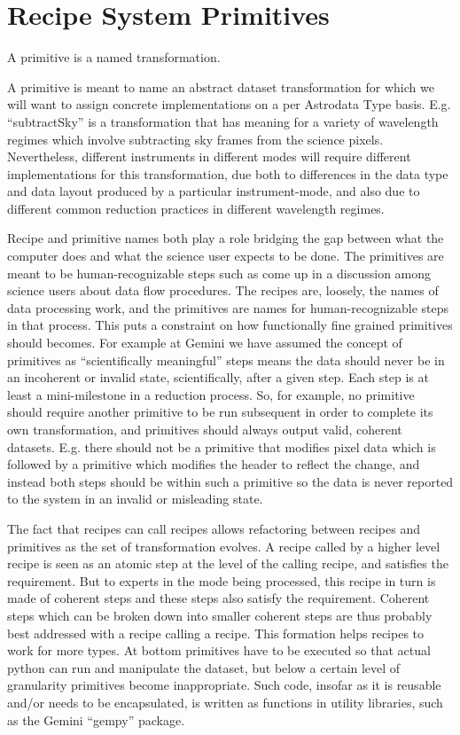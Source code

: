 \documentclass[letterpaper,10pt,english]{sphinxmanual}
\begin{document}
\section{Recipe System Primitives}
\label{gen.ADMANUAL_ADConcepts:recipe-system-primitives}
A primitive is a named transformation.

A primitive is meant to name an abstract dataset transformation for
which we will want to assign concrete implementations on a per
Astrodata Type basis. E.g. ``subtractSky'' is a transformation that has
meaning for a variety of wavelength regimes which involve subtracting
sky frames from the science pixels. Nevertheless, different
instruments in different modes will require different implementations
for this transformation, due both to differences in the data type and
data layout produced by a particular instrument-mode, and also due to
different common reduction practices in different wavelength regimes.

Recipe and primitive names both play a role bridging the gap between
what the computer does and what the science user expects to be done.
The primitives are meant to be human-recognizable steps such as come
up in a discussion among science users about data flow procedures. The
recipes are, loosely, the names of data processing work, and the
primitives are names for human-recognizable steps in that process.
This puts a constraint on how functionally fine grained primitives
should becomes. For example at Gemini we have assumed the concept of
primitives as ``scientifically meaningful'' steps means the data should
never be in an incoherent or invalid state, scientifically, after a
given step. Each step is at least a mini-milestone in a reduction
process. So, for example, no primitive should require another
primitive to be run subsequent in order to complete its own
transformation, and primitives should always output valid, coherent
datasets. E.g. there should not be a primitive that modifies pixel
data which is followed by a primitive which modifies the header to
reflect the change, and instead both steps should be within such a
primitive so the data is never reported to the system in an invalid or
misleading state.

The fact that recipes can call recipes allows refactoring between
recipes and primitives as the set of transformation evolves. A recipe
called by a higher level recipe is seen as an atomic step at the level
of the calling recipe, and satisfies the requirement. But to experts
in the mode being processed, this recipe in turn is made of coherent
steps and these steps also satisfy the requirement. Coherent steps
which can be broken down into smaller coherent steps are thus probably
best addressed with a recipe calling a recipe. This formation helps
recipes to work for more types. At bottom primitives have to be
executed so that actual python can run and manipulate the dataset, but
below a certain level of granularity primitives become inappropriate.
Such code, insofar as it is reusable and/or needs to be encapsulated,
is written as functions in utility libraries, such as the Gemini
``gempy'' package.
\end{document}
